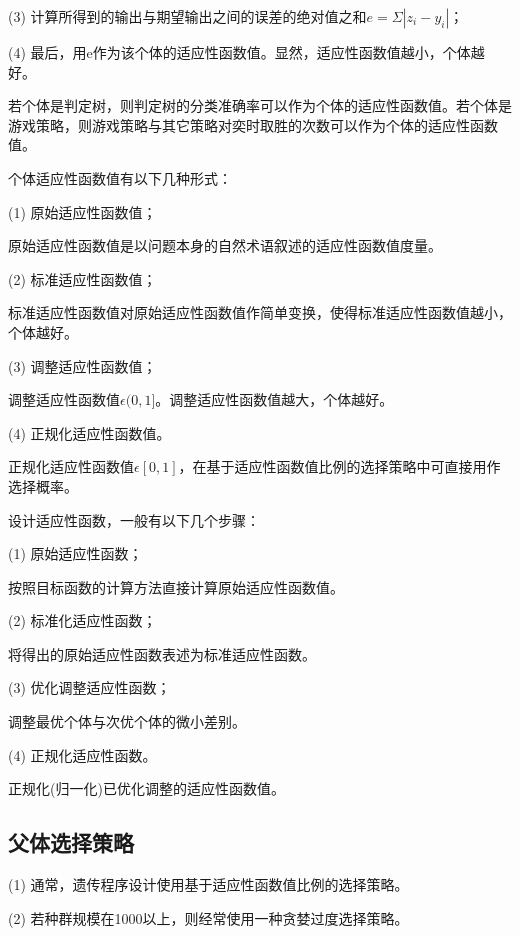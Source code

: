 \documentclass[UTF8]{ctexart}
\begin{document}
	(3) 计算所得到的输出与期望输出之间的误差的绝对值之和$e=\Sigma|z_{i}-y_{i}|$；
	
	(4) 最后，用e作为该个体的适应性函数值。显然，适应性函数值越小，个体越好。
	
	若个体是判定树，则判定树的分类准确率可以作为个体的适应性函数值。若个体是游戏策略，则游戏策略与其它策略对奕时取胜的次数可以作为个体的适应性函数值。
	
	个体适应性函数值有以下几种形式：
	
	(1) 原始适应性函数值；
	
	原始适应性函数值是以问题本身的自然术语叙述的适应性函数值度量。
	
	(2) 标准适应性函数值；
	
	标准适应性函数值对原始适应性函数值作简单变换，使得标准适应性函数值越小，个体越好。
	
	(3) 调整适应性函数值；
	
	调整适应性函数值$\epsilon(0,1]$。调整适应性函数值越大，个体越好。
	
	(4) 正规化适应性函数值。
	
	正规化适应性函数值$\epsilon[0,1]$，在基于适应性函数值比例的选择策略中可直接用作选择概率。
	
	设计适应性函数，一般有以下几个步骤：
	
	(1) 原始适应性函数；
	
	按照目标函数的计算方法直接计算原始适应性函数值。
	
	(2) 标准化适应性函数；
	
	将得出的原始适应性函数表述为标准适应性函数。
	
	(3) 优化调整适应性函数；
	
	调整最优个体与次优个体的微小差别。
	
	(4) 正规化适应性函数。
	
	正规化(归一化)已优化调整的适应性函数值。
	
\subsection{父体选择策略}		
	(1) 通常，遗传程序设计使用基于适应性函数值比例的选择策略。
	
	(2) 若种群规模在1000以上，则经常使用一种贪婪过度选择策略。
	
\end{document}
